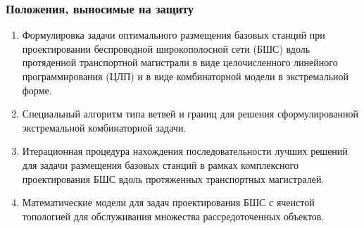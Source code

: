 \begin{frame}
    \setcounter{framenumber}{1}
    \maketitle
\end{frame}

\begin{frame}
    \frametitle{Положения, выносимые на защиту}
    
\begin{enumerate}
    \item Формулировка задачи оптимального размещения базовых станций при проектировании беспроводной широкополосной сети (БШС) вдоль протяденной транспортной магистрали в виде целочисленного линейного программирования (ЦЛП) и в виде комбинаторной модели в экстремальной форме.
   
    \item Специальный алгоритм типа ветвей и границ для решения сформулированной экстремальной комбинаторной задачи.
    \item Итерационная процедура нахождения последовательности лучших решений для задачи размещения базовых станций в рамках комплексного проектирования БШС вдоль протяженных транспортных магистралей.
    \item Математические модели для задач проектирования БШС с ячеистой топологией для обслуживания множества рассредоточенных объектов.

\end{enumerate}
\end{frame}





